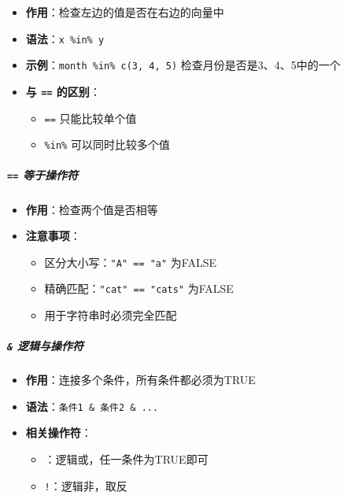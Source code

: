 \documentclass[
  twoside]{book}
\providecommand{\tightlist}{%
  \setlength{\itemsep}{0pt}\setlength{\parskip}{0pt}}
\begin{document}
\begin{itemize}
\tightlist
\item
  \textbf{作用}：检查左边的值是否在右边的向量中
\item
  \textbf{语法}：\texttt{x\ \%in\%\ y}
\item
  \textbf{示例}：\texttt{month\ \%in\%\ c(3,\ 4,\ 5)} 检查月份是否是3、4、5中的一个
\item
  \textbf{与 \texttt{==} 的区别}：

  \begin{itemize}
  \tightlist
  \item
    \texttt{==} 只能比较单个值
  \item
    \texttt{\%in\%} 可以同时比较多个值
  \end{itemize}
\end{itemize}

\hypertarget{ux7b49ux4e8eux64cdux4f5cux7b26}{%
\subparagraph{\texorpdfstring{\texttt{==} 等于操作符}{== 等于操作符}}\label{ux7b49ux4e8eux64cdux4f5cux7b26}}

\begin{itemize}
\tightlist
\item
  \textbf{作用}：检查两个值是否相等
\item
  \textbf{注意事项}：

  \begin{itemize}
  \tightlist
  \item
    区分大小写：\texttt{"A"\ ==\ "a"} 为FALSE
  \item
    精确匹配：\texttt{"cat"\ ==\ "cats"} 为FALSE
  \item
    用于字符串时必须完全匹配
  \end{itemize}
\end{itemize}

\hypertarget{ux903bux8f91ux4e0eux64cdux4f5cux7b26}{%
\subparagraph{\texorpdfstring{\texttt{\&} 逻辑与操作符}{\& 逻辑与操作符}}\label{ux903bux8f91ux4e0eux64cdux4f5cux7b26}}

\begin{itemize}
\tightlist
\item
  \textbf{作用}：连接多个条件，所有条件都必须为TRUE
\item
  \textbf{语法}：\texttt{条件1\ \&\ 条件2\ \&\ ...}
\item
  \textbf{相关操作符}：

  \begin{itemize}
  \tightlist
  \item
    \texttt{\textbar{}}：逻辑或，任一条件为TRUE即可
  \item
    \texttt{!}：逻辑非，取反
  \end{itemize}
\end{itemize}
\end{document}
